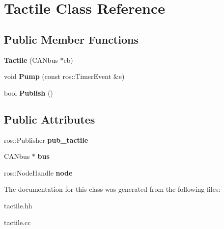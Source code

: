 \hypertarget{classTactile}{\section{Tactile Class Reference}
\label{classTactile}
}
\subsection*{Public Member Functions}
\begin{DoxyCompactItemize}
\item 
\hypertarget{classTactile_a27eb0a52bf1a3bdb5cdae37483cbb35d}{{\bfseries Tactile} (C\-A\-Nbus $\ast$cb)}\label{classTactile_a27eb0a52bf1a3bdb5cdae37483cbb35d}

\item 
\hypertarget{classTactile_afde25ea7a090f2e5679338798d27c977}{void {\bfseries Pump} (const ros\-::\-Timer\-Event \&e)}\label{classTactile_afde25ea7a090f2e5679338798d27c977}

\item 
\hypertarget{classTactile_acdb7ffdff07f0ffef04aeceae686aa01}{bool {\bfseries Publish} ()}\label{classTactile_acdb7ffdff07f0ffef04aeceae686aa01}

\end{DoxyCompactItemize}
\subsection*{Public Attributes}
\begin{DoxyCompactItemize}
\item 
\hypertarget{classTactile_a350ed804ee1f9bce2d3e7dc2a239ca66}{ros\-::\-Publisher {\bfseries pub\-\_\-tactile}}\label{classTactile_a350ed804ee1f9bce2d3e7dc2a239ca66}

\item 
\hypertarget{classTactile_a442bf5894233288ee1d4a1f06077a9c4}{C\-A\-Nbus $\ast$ {\bfseries bus}}\label{classTactile_a442bf5894233288ee1d4a1f06077a9c4}

\item 
\hypertarget{classTactile_aeaf2c8e59dc7e36e8fa15ecb6eb7ac4f}{ros\-::\-Node\-Handle {\bfseries node}}\label{classTactile_aeaf2c8e59dc7e36e8fa15ecb6eb7ac4f}

\end{DoxyCompactItemize}


The documentation for this class was generated from the following files\-:\begin{DoxyCompactItemize}
\item 
tactile.\-hh\item 
tactile.\-cc\end{DoxyCompactItemize}

